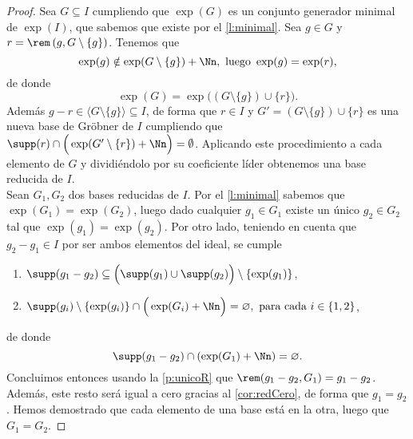 \begin{proof}
     Sea $G\subseteq I$ cumpliendo que $\exp(G)$ es un conjunto generador minimal de $\exp(I)$, que sabemos que existe por el \autoref{l:minimal}. Sea $g\in G$ y $r = \rem\left(g, G\setminus \{g\}\right)$. Tenemos que
    \begin{equation*}
        \exp(g) \notin \exp(G\setminus\{g\}) + \Nn, \text{ luego } \exp(g)=\exp(r),
    \end{equation*}
    de donde
    \begin{equation*}
        \exp(G) = \exp\Big( (G\setminus \{g\})\cup \{r\}\Big).
    \end{equation*}
    Además $g-r\in \langle G\setminus \{g\} \rangle \subseteq I$, de forma que $r\in I$ y $G' = (G\setminus \{g\}) \cup \{r\}$ es una nueva base de Gröbner de $I$ cumpliendo que $\supp(r) \cap \Big(\exp(G'\setminus\{r\}) + \Nn \Big) = \emptyset$.
    Aplicando este procedimiento a cada elemento de $G$ y dividiéndolo por su coeficiente líder obtenemos una base reducida de $I$.\\[5pt]
     Sean $G_1,G_2$ dos bases reducidas de $I$. Por el \autoref{l:minimal} sabemos que $\exp(G_1) = \exp(G_2)$, luego dado cualquier $g_1\in G_1$ existe un único $g_2\in G_2$ tal que $\exp(g_1) = \exp(g_2)$. Por otro lado, teniendo en cuenta que $g_2-g_1\in I$ por ser ambos elementos del ideal, se cumple
    \begin{enumerate}
        \item $ \supp(g_1-g_2) \subseteq \Big( \supp(g_1)\cup \supp(g_2) \Big) \setminus \{\exp(g_1)\}$,
        \item $\supp(g_i)\setminus \{\exp(g_i)\}\cap \Big(\exp(G_i) + \Nn\Big) = \varnothing,\text{ para cada } i\in\{1,2\}$,
    \end{enumerate}
    de donde
    \begin{equation*}
        \supp(g_1-g_2) \cap \left(\exp(G_1)+\Nn\right) = \varnothing.
    \end{equation*}
    Concluimos entonces usando la \autoref{p:unicoR} que $\rem(g_1-g_2, G_1) = g_1-g_2$. Además, este resto será igual a cero gracias al \autoref{cor:redCero}, de forma que $g_1=g_2$. Hemos demostrado que cada elemento de una base está en la otra, luego que $G_1 = G_2$.
\end{proof}

